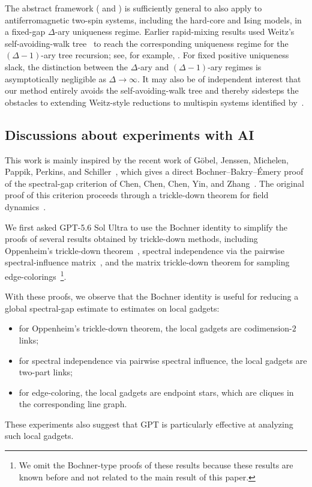 \documentclass[a4paper,12pt]{article}
\theoremstyle{plain}
\theoremstyle{definition}
\begin{document}
\begin{remark}
  The abstract framework ( and ) is sufficiently general to also apply to antiferromagnetic
  two-spin systems, including the hard-core and Ising models, in a fixed-gap
  $\Delta$-ary uniqueness regime.  Earlier rapid-mixing results used Weitz's
  self-avoiding-walk tree~\cite{Weitz2006} to reach the corresponding
  uniqueness regime for the $(\Delta-1)$-ary tree recursion; see, for example,
  \cite{ALO2020,ChenLiuVigodaContraction2021,ChenFengYinZhang2024,ChenChenYinZhang2025}.  For fixed positive
  uniqueness slack, the distinction between the $\Delta$-ary and
  $(\Delta-1)$-ary regimes is asymptotically negligible as $\Delta\to\infty$.
  It may also be of independent interest that our method entirely avoids the
  self-avoiding-walk tree and thereby sidesteps the obstacles to extending
  Weitz-style reductions to multispin systems identified
  by~\cite{LiuManiPernice2024}.
\end{remark}


\subsection{Discussions about experiments with AI}
This work is mainly inspired by the recent work of G\"obel, Jenssen,
Michelen, Pappik, Perkins, and Schiller~\cite{GoebelEtAl2026}, which gives a
direct Bochner--Bakry--\'Emery proof of the spectral-gap criterion of Chen,
Chen, Chen, Yin, and Zhang~\cite{ChenEtAl2025RandomRegular}.  The original
proof of this criterion proceeds through a trickle-down theorem for field
dynamics~\cite{ChenEtAl2025RandomRegular}.

We first asked GPT-5.6 Sol Ultra to use the Bochner identity to simplify the
proofs of several results obtained by trickle-down methods, including
Oppenheim's trickle-down theorem~\cite{Oppenheim2018,AlevLau2020}, spectral independence via the pairwise
spectral-influence matrix~\cite{LeakeOveisGharan2025}, and the matrix
trickle-down theorem for sampling
edge-colorings~\cite{ALG2021}\footnote{We omit the Bochner-type proofs of
these results because these results are known before and not related to the main result of this paper.}.

With these proofs, we observe that the Bochner identity is useful for
reducing a global spectral-gap estimate to estimates on local gadgets:
\begin{itemize}
\item for Oppenheim's trickle-down theorem, the local gadgets are
  codimension-$2$ links;
\item for spectral independence via pairwise spectral influence, the local
  gadgets are two-part links;
\item for edge-coloring, the local gadgets are endpoint stars, which are
  cliques in the corresponding line graph.
\end{itemize}
These experiments also suggest that GPT is particularly effective at
analyzing such local gadgets.
\end{document}
